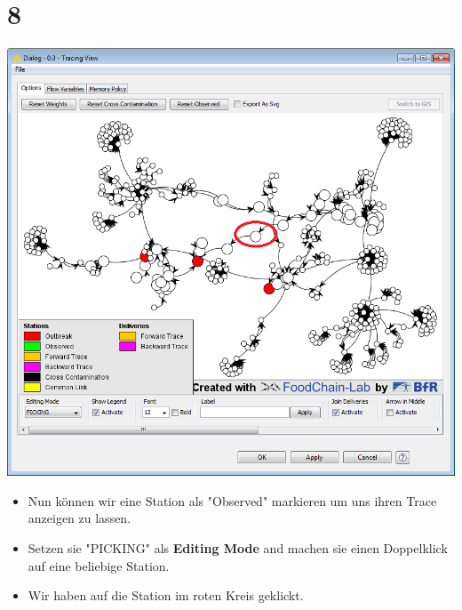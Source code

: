 \documentclass{beamer}
\begin{document}
\section{8}
\begin{frame}
	\begin{center}
  		\includegraphics[height=0.6\textheight]{8.png}
	\end{center}
	\begin{itemize}
		\item Nun können wir eine Station als "Observed" markieren um uns ihren Trace anzeigen zu lassen.
		\item Setzen sie "PICKING" als \textbf{Editing Mode} and machen sie einen Doppelklick auf eine beliebige Station.
		\item Wir haben auf die Station im roten Kreis geklickt.
	\end{itemize}
\end{frame}
\end{document}
